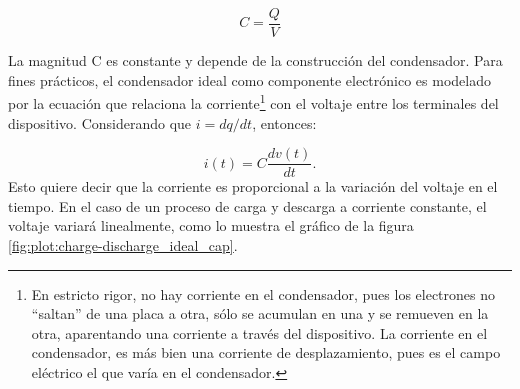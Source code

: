 \begin{equation}
	C = \frac{Q}{V}
\end{equation}

La magnitud C es constante y depende de la construcción del condensador. Para fines prácticos, el condensador ideal como componente electrónico es modelado por la ecuación que relaciona la corriente\footnote{En estricto rigor, no hay corriente en el condensador, pues los electrones no ``saltan'' de una placa a otra, sólo se acumulan en una y se remueven en la otra, aparentando una corriente a través del dispositivo. La corriente en el condensador, es más bien una corriente de desplazamiento, pues es el campo eléctrico el que varía en el condensador.} con el voltaje entre los terminales del dispositivo. Considerando que $i = dq/dt$, entonces:

\begin{equation}
	i(t) = C \frac{dv(t)}{dt}.
\end{equation}
Esto quiere decir que la corriente es proporcional a la variación del voltaje en el tiempo.
En el caso de un proceso de carga y descarga a corriente constante, el voltaje variará linealmente, como lo muestra el gráfico de la figura \ref{fig:plot:charge-discharge_ideal_cap}.

